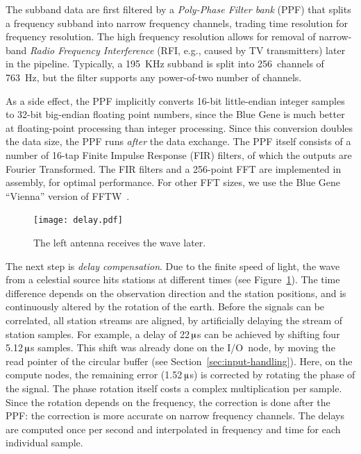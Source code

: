 \documentclass{sig-alternate}
\newcommand{\us}{\,$\muup$s\xspace}
\begin{document}
The subband data are first filtered by a \emph{Poly-Phase Filter bank\/} (PPF) that
splits a frequency subband into narrow frequency channels, trading time
resolution for frequency resolution.
The high frequency resolution allows for removal of narrow-band
\emph{Radio Frequency Interference\/} (RFI, e.g., caused by TV transmitters)
later in the pipeline.
Typically, a 195~KHz subband is split into 256~channels of 763~Hz, but the
filter supports any power-of-two number of channels.

As a side effect, the PPF implicitly converts 16-bit little-endian integer
samples to 32-bit big-endian floating point numbers, since the Blue Gene is
much better at floating-point processing than integer processing.
Since this conversion doubles the data size, the PPF runs \emph{after\/} the
data exchange.
The PPF itself consists of a number of 16-tap Finite Impulse Response (FIR)
filters, of which the outputs are Fourier Transformed.
The FIR filters and a 256-point FFT are implemented in assembly, for optimal
performance.
For other FFT sizes, we use the Blue Gene ``Vienna'' version of
FFTW~\cite{Lorenz:05}.


\begin{figure}[ht]
\begin{center}
\texttt{[image: delay.pdf]}
\end{center}
\caption{The left antenna receives the wave later.}
\label{fig:delay}
\end{figure}

The next step is \emph{delay compensation}.
Due to the finite speed of light, the wave from a celestial source hits
stations at different times (see Figure~\ref{fig:delay}).
The time difference depends on the observation direction and the
station positions, and is continuously altered by the rotation of the earth.
Before the signals can be correlated, all station streams are aligned,
by artificially delaying the stream of station samples.
For example, a delay of 22\us can be achieved by shifting four 5.12\us
samples.
This shift was already done on the I/O~node, by moving the read pointer
of the circular buffer (see Section~\ref{sec:input-handling}).
Here, on the compute nodes, the remaining error (1.52\us) is corrected by
rotating the phase of the signal.
The phase rotation itself costs a complex multiplication per sample.
Since the rotation depends on the frequency, the correction is done after 
the PPF: the correction is more accurate on narrow frequency channels.
The delays are computed once per second and interpolated in frequency
and time for each individual sample.
\end{document}
